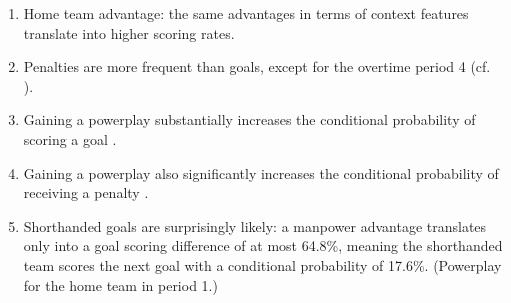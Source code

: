 \documentclass[]{article}
\begin{document}
\begin{enumerate}
\item Home team advantage: the same advantages in terms of context features translate into higher scoring rates.
\item Penalties are more frequent than goals, except for the overtime period 4 (cf. \citep{Schuckers2012}).
\item Gaining a powerplay substantially increases the conditional probability of scoring a goal \citep{Thomas2013}.
\item Gaining a powerplay also significantly increases the conditional probability of receiving a penalty \citep{Schuckers2012}.
\item Shorthanded goals are surprisingly likely: a manpower advantage translates only into a goal scoring difference of at most 64.8\%, meaning the shorthanded team scores the next goal with a conditional probability of 17.6\%. (Powerplay for the home team in period 1.)

\end{enumerate}
\end{document}
